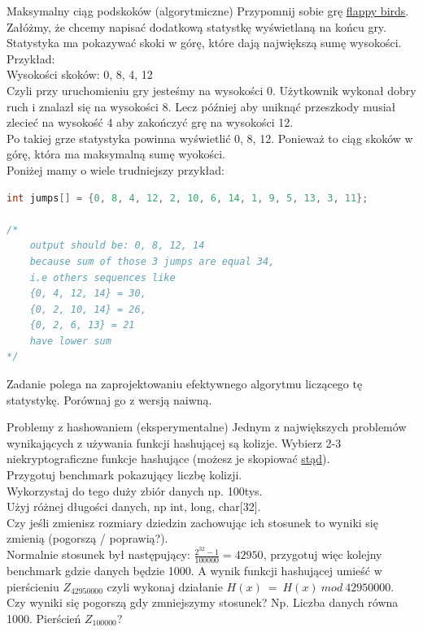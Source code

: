 \begin{exercise}{Maksymalny ciąg podskoków (algorytmiczne)}{}
Przypomnij sobie grę \href{https://www.youtube.com/watch?v=WSW-5m8lRMs&t}{flappy birds}. \\
Załóżmy, że chcemy napisać dodatkową statystkę wyświetlaną na końcu gry. Statystyka ma pokazywać skoki w górę, które dają największą sumę wysokości. \\

Przykład: \\
Wysokości skoków: 0, 8, 4, 12 \\
Czyli przy uruchomieniu gry jesteśmy na wysokości 0. Użytkownik wykonał dobry ruch i znalazł się na wysokości 8. Lecz później aby uniknąć przeszkody musiał zlecieć na wysokość 4 aby zakończyć grę na wysokości 12. \\
Po takiej grze statystyka powinna wyświetlić 0, 8, 12. Ponieważ to ciąg skoków w górę, która ma maksymalną sumę wyokości. \\

Poniżej mamy o wiele trudniejszy przykład:
\begin{lstlisting}[language=C,style=C99]
int jumps[] = {0, 8, 4, 12, 2, 10, 6, 14, 1, 9, 5, 13, 3, 11};

/* 
    output should be: 0, 8, 12, 14
    because sum of those 3 jumps are equal 34,
    i.e others sequences like 
    {0, 4, 12, 14} = 30,
    {0, 2, 10, 14} = 26,
    {0, 2, 6, 13} = 21  
    have lower sum
*/
\end{lstlisting}
Zadanie polega na zaprojektowaniu efektywnego algorytmu liczącego tę statystykę. Porównaj go z wersją naiwną.
\end{exercise}

\clearpage

\begin{exercise}{Problemy z hashowaniem (eksperymentalne)}{}
Jednym z największych problemów wynikających z używania funkcji hashującej są kolizje. Wybierz 2-3 niekryptograficzne funkcje hashujące (możesz je skopiować \href{https://github.com/Kukos/MyLibs/blob/master/src/hash/hash.c}{stąd}). \\

Przygotuj benchmark pokazujący liczbę kolizji.\\ 
Wykorzystaj do tego duży zbiór danych np. 100tys. \\
Użyj różnej długości danych, np int, long, char[32]. \\

Czy jeśli zmienisz rozmiary dziedzin zachowując ich stosunek to wyniki się zmienią (pogorszą / poprawią?). \\
Normalnie stosunek był następujący: $\frac{2^{32}-1}{100000}=42950$, przygotuj więc kolejny benchmark gdzie danych będzie 1000. A wynik funkcji hashującej umieść w pierścieniu $Z_{42950000}$ czyli wykonaj działanie $H(x)\ =\ H(x)\ mod\ 42950000$. \\

Czy wyniki się pogorszą gdy zmniejszymy stosunek? Np. Liczba danych równa 1000. Pierścień $Z_{100000}$?
\end{exercise}

